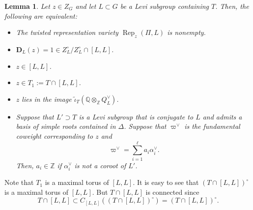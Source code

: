 \documentclass[11pt,oneside,dvipsnames]{amsart}
\theoremstyle{plain}
\newtheorem{Lem}[Thm]{Lemma}
\theoremstyle{definition}
\theoremstyle{named}
\DeclareMathOperator{\Rep}{Rep}
\begin{document}
\begin{Lem}\label{Lem-z-in-Lz}
Let $z\in Z_G$ and let $L\subset G$ be a Levi subgroup containing $T$. Then, the following are equivalent:
\begin{itemize}
\item[(i)] The twisted representation variety $\Rep_z(\Pi,L)$ is nonempty.
\item[(ii)] $\mathbf{D}_L(z)=1\in Z_L^{\circ}/Z_L^{\circ}\cap [L,L]$.
\item[(iii)] $z\in [L,L]$.
\item[(iv)] $z\in T_1:=T\cap[L,L]$.
\item[(v)] $z$ lies in the image $\tilde{\iota}_T(\mathbb{Q}\otimes_{\mathbb{Z}}Q_L^{\vee})$.
\item[(vi)] Suppose that $L'\supset T$ is a Levi subgroup that is conjugate to $L$ and admits a basis of simple roots contained in $\Delta$. Suppose that $\varpi^{\vee}$ is the fundamental coweight corresponding to $z$ and 
$$
\varpi^{\vee}=\sum_{i=1}^{\ell}a_i\alpha_i^{\vee}.
$$
Then, $a_i\in\mathbb{Z}$ if $\alpha_i^{\vee}$ is not a coroot of $L'$.
\end{itemize}
\end{Lem}
Note that $T_1$ is a maximal torus of $[L,L]$. It is easy to see that $(T\cap[L,L])^{\circ}$ is a maximal torus of $[L,L]$. But $T\cap[L,L]$ is connected since 
$$
T\cap[L,L]\subset C_{[L,L]}((T\cap[L,L])^{\circ})=(T\cap[L,L])^{\circ}.
$$
\end{document}
